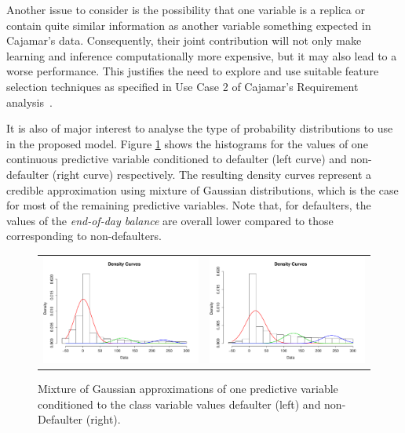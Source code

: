 Another issue to consider is the possibility that one variable is a replica or contain quite similar information as another variable something expected in Cajamar's data. Consequently, their joint contribution will not only make learning and inference computationally more expensive, but it may also lead to a worse performance. This justifies the need to explore and use suitable feature selection techniques as specified in Use Case 2 of Cajamar's Requirement analysis~\cite{Fer14b}.

It is also of major interest to analyse the type of probability distributions to use in the proposed model. Figure \ref{Figure:cajamarMixt} shows the histograms for the values of one continuous predictive variable conditioned to defaulter (left curve) and non-defaulter (right curve) respectively. The resulting density curves represent a credible approximation using mixture of Gaussian distributions, which is the case for most of the remaining predictive variables. Note that, for defaulters, the values of the \emph{end-of-day balance} are overall lower compared to those corresponding to non-defaulters.

\begin{figure}[ht!]
  \centering
    \begin{tabular}{cc}
    \includegraphics[width=70mm]{figures/CajaMarmixtureBalanceDef}&
    \includegraphics[width=70mm]{figures/CajaMarmixtureBalanceNonDef}\\
  \end{tabular}
    \caption{\label{Figure:cajamarMixt}Mixture of Gaussian approximations of one predictive variable conditioned to the class variable values defaulter (left) and non-Defaulter (right).}
\end{figure}

